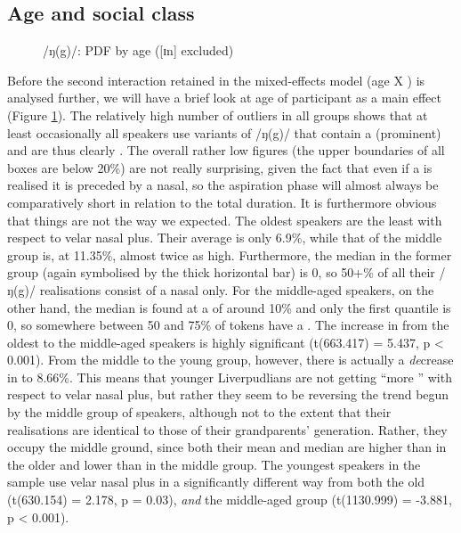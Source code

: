 \subsection{Age and social class}
\label{sec.prod.res.con.ng.ageclass}

\begin{figure}[h]
	\centering
		\resizebox{0.5\linewidth}{!}{} 
	\caption{/ŋ(g)/: PDF by age ([ɪn] excluded)}
	\label{fig.box.ng.tot}
\end{figure}

Before the second interaction retained in the mixed-effects model (age X ) is analysed further, we will have a brief look at age of participant as a main effect (Figure \ref{fig.box.ng.tot}).
The relatively high number of outliers in all groups shows that at least occasionally all speakers use variants of /ŋ(g)/ that contain a (prominent)  and are thus clearly .
The overall rather low figures (the upper boundaries of all boxes are below 20\%) are not really surprising, given the fact that even if a  is realised it is preceded by a nasal, so the aspiration phase will almost always be comparatively short in relation to the total duration.
It is furthermore obvious that things are not the way we expected.
The oldest speakers are the least  with respect to velar nasal plus.
Their average  is only 6.9\%, while that of the middle group is, at 11.35\%, almost twice as high.
Furthermore, the median in the former group (again symbolised by the thick horizontal bar) is 0, so 50+\% of all their /ŋ(g)/ realisations consist of a nasal only.
For the middle-aged speakers, on the other hand, the median is found at a  of around 10\% and only the first quantile is 0, so somewhere between 50 and 75\% of tokens have a .
The increase in  from the oldest to the middle-aged speakers is highly significant (t(663.417) = 5.437, p < 0.001).
From the middle to the young group, however, there is actually a \emph{de}crease in  to 8.66\%.
This means that younger Liverpudlians are not getting ``more '' with respect to velar nasal plus, but rather they seem to be reversing the trend begun by the middle group of speakers, although not to the extent that their realisations are identical to those of their grandparents' generation.
Rather, they occupy the middle ground, since both their mean and median are higher than in the older and lower than in the middle group.
The youngest speakers in the sample use velar nasal plus in a significantly different way from both the old (t(630.154) = 2.178, p = 0.03), \emph{and} the middle-aged group (t(1130.999) = -3.881, p < 0.001).


